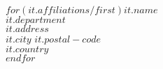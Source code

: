 $for(it.affiliations/first)$$it.name$\\$it.department$\\$it.address$\\$it.city$ $it.postal-code$\\$it.country$\\[2mm]$endfor$